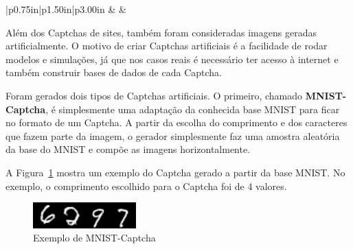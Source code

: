 \documentclass[12pt,twoside,brazilian]{book}
\begin{document}
\begin{table}[H]
\begin{longtable}[c]{|p{0.75in}|p{1.50in}|p{3.00in}}
 &  &  \\




\end{longtable}

\end{table}

Além dos Captchas de sites, também foram consideradas imagens geradas
artificialmente. O motivo de criar Captchas artificiais é a facilidade
de rodar modelos e simulações, já que nos casos reais é necessário ter
acesso à internet e também construir bases de dados de cada Captcha.

Foram gerados dois tipos de Captchas artificiais. O primeiro, chamado
\textbf{MNIST-Captcha}, é simplesmente uma adaptação da conhecida base
MNIST para ficar no formato de um Captcha. A partir da escolha do
comprimento e dos caracteres que fazem parte da imagem, o gerador
simplesmente faz uma amostra aleatória da base do MNIST e compõe as
imagens horizontalmente.

A Figura~\ref{fig-captcha-mnist} mostra um exemplo do Captcha gerado a
partir da base MNIST. No exemplo, o comprimento escolhido para o Captcha
foi de 4 valores.

\begin{figure}

{\centering \includegraphics[width=1.5625in,height=\textheight]{./assets/img/mnist128c49c36e13_6297.png}

}

\caption{\label{fig-captcha-mnist}Exemplo de MNIST-Captcha}

\end{figure}
\end{document}
